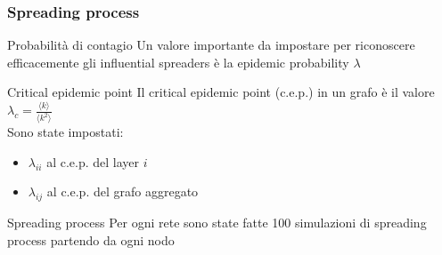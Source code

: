 \begin{frame}
    \frametitle{Spreading process}
    \begin{block}{Probabilità di contagio}
        Un valore importante da impostare per riconoscere efficacemente gli influential spreaders è la 
        \alert{epidemic probability} $\lambda$
    \end{block}
    \pause
    \begin{block}{Critical epidemic point}
        Il \alert{critical epidemic point} (c.e.p.) in un grafo è il valore
        $\lambda_c = \frac{\langle k \rangle}{\langle k^2 \rangle}$ \\
        Sono state impostati:
        \begin{itemize}
            \item $\lambda_{ii}$ al c.e.p. del layer $i$
            \item $\lambda_{ij}$ al c.e.p. del grafo aggregato
        \end{itemize}
    \end{block}
    
    \begin{block}{Spreading process}
        Per ogni rete sono state fatte 100 simulazioni di spreading process partendo
        da ogni nodo
    \end{block}


\end{frame}